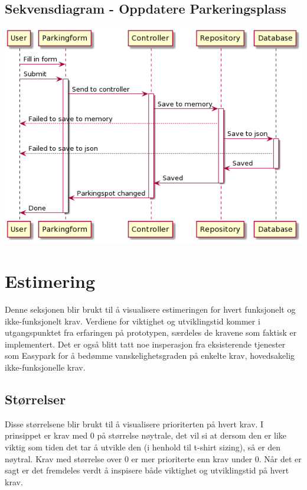 \documentclass[12pt]{article}
\begin{document}
    \subsection{Sekvensdiagram - Oppdatere Parkeringsplass}
    \includegraphics[max width=\textwidth]{bilder/diagrammer/sekvensdiagramOppdaterPplass.png}

\section{Estimering}
Denne seksjonen blir brukt til å visualisere estimeringen for hvert funksjonelt og ikke-funksjonelt krav. Verdiene for viktighet og utviklingstid kommer i utgangspunktet fra erfaringen på prototypen, særdeles de kravene som faktisk er implementert. Det er også blitt tatt noe insperasjon fra eksisterende tjenester som Easypark for å bedømme vanskelighetsgraden på enkelte krav, hovedsakelig ikke-funksjonelle krav.

    \subsection{Størrelser}
    Disse størrelsene blir brukt til å visualisere prioriterten på hvert krav. I prinsippet er krav med 0 på størrelse nøytrale, det vil si at dersom den er like viktig som tiden det tar å utvikle den (i henhold til t-shirt sizing), så er den nøytral. Krav med størrelse over 0 er mer prioriterte enn krav under 0. Når det er sagt er det fremdeles verdt å inspisere både viktighet og utviklingstid på hvert krav.
\end{document}
